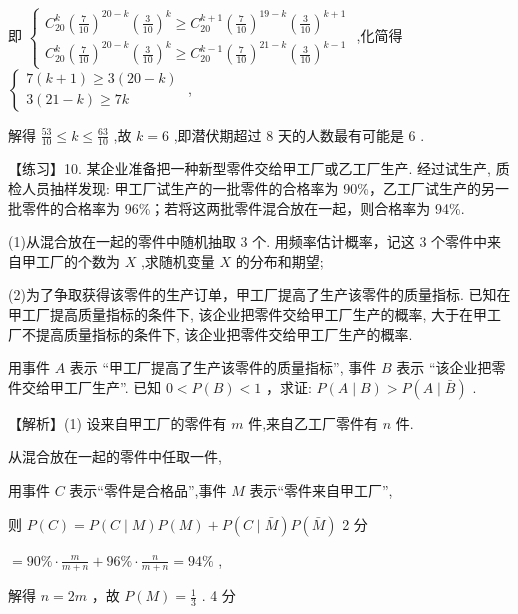 \documentclass[10pt]{article}
\begin{document}
即 \(\left\{  \begin{array}{l} {C}_{20}^{k}{\left( \frac{7}{10}\right) }^{{20} - k}{\left( \frac{3}{10}\right) }^{k} \geq  {C}_{20}^{k + 1}{\left( \frac{7}{10}\right) }^{{19} - k}{\left( \frac{3}{10}\right) }^{k + 1} \\  {C}_{20}^{k}{\left( \frac{7}{10}\right) }^{{20} - k}{\left( \frac{3}{10}\right) }^{k} \geq  {C}_{20}^{k - 1}{\left( \frac{7}{10}\right) }^{{21} - k}{\left( \frac{3}{10}\right) }^{k - 1} \end{array}\right.\) ,化简得 \(\left\{  \begin{array}{l} 7\left( {k + 1}\right)  \geq  3\left( {{20} - k}\right) \\  3\left( {{21} - k}\right)  \geq  {7k} \end{array}\right.\) ,

解得 \(\frac{53}{10} \leq  k \leq  \frac{63}{10}\) ,故 \(k = 6\) ,即潜伏期超过 8 天的人数最有可能是 6 .

【练习】10. 某企业准备把一种新型零件交给甲工厂或乙工厂生产. 经过试生产, 质检人员抽样发现: 甲工厂试生产的一批零件的合格率为 90\%，乙工厂试生产的另一批零件的合格率为 96\%；若将这两批零件混合放在一起，则合格率为 94\%.

(1)从混合放在一起的零件中随机抽取 3 个. 用频率估计概率，记这 3 个零件中来自甲工厂的个数为 \(X\) ,求随机变量 \(X\) 的分布和期望;

(2)为了争取获得该零件的生产订单，甲工厂提高了生产该零件的质量指标. 已知在甲工厂提高质量指标的条件下, 该企业把零件交给甲工厂生产的概率, 大于在甲工厂不提高质量指标的条件下, 该企业把零件交给甲工厂生产的概率.

用事件 \(A\) 表示 “甲工厂提高了生产该零件的质量指标”, 事件 \(B\) 表示 “该企业把零件交给甲工厂生产”. 已知 \(0 < P\left( B\right)  < 1\) ，求证: \(P\left( {A \mid  B}\right)  > P\left( {A \mid  \bar{B}}\right)\) .

【解析】(1) 设来自甲工厂的零件有 \(m\) 件,来自乙工厂零件有 \(n\) 件.

从混合放在一起的零件中任取一件,

用事件 \(C\) 表示“零件是合格品”,事件 \(M\) 表示“零件来自甲工厂”,

则 \(P\left( C\right)  = P\left( {C \mid  M}\right) P\left( M\right)  + P\left( {C \mid  \bar{M}}\right) P\left( \bar{M}\right)\) 2 分

\(= {90}\%  \cdot  \frac{m}{m + n} + {96}\%  \cdot  \frac{n}{m + n} = {94}\%\) ,

解得 \(n = {2m}\) ，故 \(P\left( M\right)  = \frac{1}{3}\) . 4 分
\end{document}
